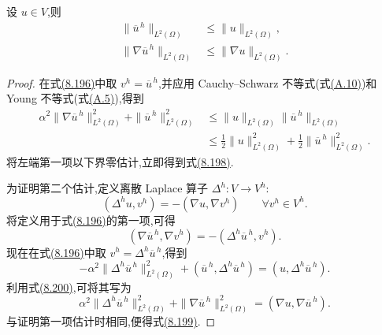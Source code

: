 \begin{lemma}[离散微分滤波器的稳定性]
\label{lem:leray-alpha-discrete-filter-stability}
设 $u\in V$,则
\begin{align}
 \|\overline{u}^{\,h}\|_{L^2(\Omega)}
 &\le \|u\|_{L^2(\Omega)},\label{eq:leray-alpha-discrete-filter-L2-stability}\\
 \|\nabla\overline{u}^{\,h}\|_{L^2(\Omega)}
 &\le \|\nabla u\|_{L^2(\Omega)}.\label{eq:leray-alpha-discrete-filter-H1-stability}
\end{align}
\begin{proof}
在式\hyperref[eq:leray-alpha-discrete-differential-filter]{(8.196)}中取 $v^h=\overline{u}^{\,h}$,并应用 Cauchy--Schwarz 不等式(式\hyperref[eq:appendix-a-10]{(A.10)})和 Young 不等式(式\hyperref[eq:appendix-a-5]{(A.5)}),得到
\[
\begin{aligned}
 \alpha^2\|\nabla\overline{u}^{\,h}\|_{L^2(\Omega)}^2
 +\|\overline{u}^{\,h}\|_{L^2(\Omega)}^2
 &\le \|u\|_{L^2(\Omega)}\|\overline{u}^{\,h}\|_{L^2(\Omega)}\\
 &\le\frac12\|u\|_{L^2(\Omega)}^2
     +\frac12\|\overline{u}^{\,h}\|_{L^2(\Omega)}^2.
\end{aligned}
\]
将左端第一项以下界零估计,立即得到式\hyperref[eq:leray-alpha-discrete-filter-L2-stability]{(8.198)}.

为证明第二个估计,定义离散 Laplace 算子 $\Delta^h:V\to V^h$:
\begin{equation}\label{eq:leray-alpha-discrete-laplacian}
 (\Delta^h u,v^h)=-(\nabla u,\nabla v^h)
 \qquad\forall v^h\in V^h.
\end{equation}
将定义用于式\hyperref[eq:leray-alpha-discrete-differential-filter]{(8.196)}的第一项,可得
\[
 (\nabla\overline{u}^{\,h},\nabla v^h)
 =-(\Delta^h\overline{u}^{\,h},v^h).
\]
现在在式\hyperref[eq:leray-alpha-discrete-differential-filter]{(8.196)}中取
$v^h=\Delta^h\overline{u}^{\,h}$,得到
\[
 -\alpha^2\|\Delta^h\overline{u}^{\,h}\|_{L^2(\Omega)}^2
 +(\overline{u}^{\,h},\Delta^h\overline{u}^{\,h})
 =(u,\Delta^h\overline{u}^{\,h}).
\]
利用式\hyperref[eq:leray-alpha-discrete-laplacian]{(8.200)},可将其写为
\begin{equation}\label{eq:leray-alpha-discrete-filter-H1-identity}
 \alpha^2\|\Delta^h\overline{u}^{\,h}\|_{L^2(\Omega)}^2
 +\|\nabla\overline{u}^{\,h}\|_{L^2(\Omega)}^2
 =(\nabla u,\nabla\overline{u}^{\,h}).
\end{equation}
与证明第一项估计时相同,便得式\hyperref[eq:leray-alpha-discrete-filter-H1-stability]{(8.199)}.
\end{proof}
\end{lemma}

